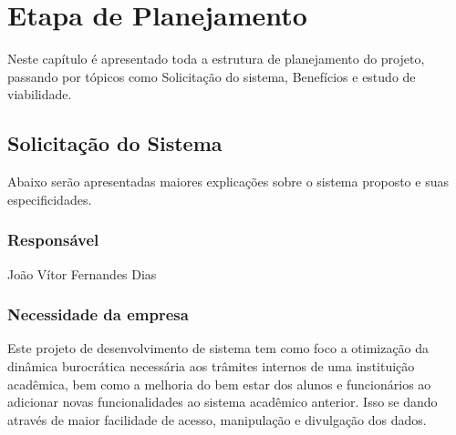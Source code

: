 \chapter{Etapa de Planejamento}
    Neste capítulo é apresentado toda a estrutura de planejamento do projeto, passando por tópicos como Solicitação do sistema, Benefícios e estudo de viabilidade.

    \section{Solicitação do Sistema}
    
    Abaixo serão apresentadas maiores explicações sobre o sistema proposto e suas especificidades.
    
    
        \subsection{Responsável}
            João Vítor Fernandes Dias   %
            
        \subsection{Necessidade da empresa}
            Este projeto de desenvolvimento de sistema tem como foco a otimização da dinâmica burocrática necessária aos trâmites internos de uma instituição acadêmica, bem como a melhoria do bem estar dos alunos e funcionários ao adicionar novas funcionalidades ao sistema acadêmico anterior. Isso se dando através de maior facilidade de acesso, manipulação e divulgação dos dados.
        
